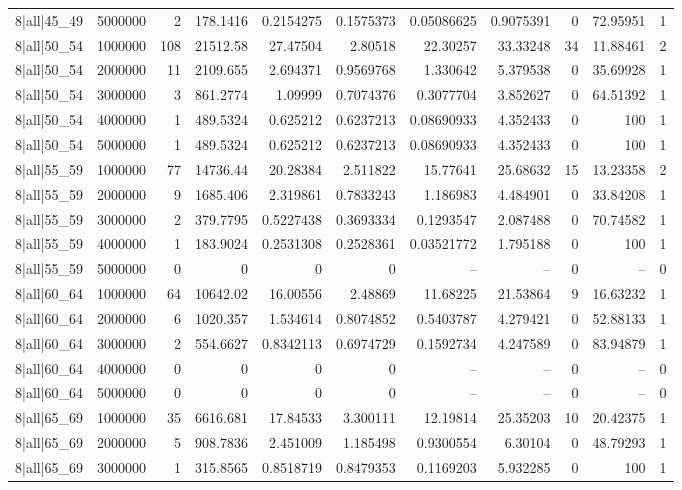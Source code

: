 \begin{tabular}{lrrrrrrrrrr}
8|all|45\_49 & 5000000 & 2 & 178.1416 & 0.2154275 & 0.1575373 & 0.05086625 & 0.9075391 & 0 & 72.95951 & 1 \\
8|all|50\_54 & 1000000 & 108 & 21512.58 & 27.47504 & 2.80518 & 22.30257 & 33.33248 & 34 & 11.88461 & 2 \\
8|all|50\_54 & 2000000 & 11 & 2109.655 & 2.694371 & 0.9569768 & 1.330642 & 5.379538 & 0 & 35.69928 & 1 \\
8|all|50\_54 & 3000000 & 3 & 861.2774 & 1.09999 & 0.7074376 & 0.3077704 & 3.852627 & 0 & 64.51392 & 1 \\
8|all|50\_54 & 4000000 & 1 & 489.5324 & 0.625212 & 0.6237213 & 0.08690933 & 4.352433 & 0 & 100 & 1 \\
8|all|50\_54 & 5000000 & 1 & 489.5324 & 0.625212 & 0.6237213 & 0.08690933 & 4.352433 & 0 & 100 & 1 \\
8|all|55\_59 & 1000000 & 77 & 14736.44 & 20.28384 & 2.511822 & 15.77641 & 25.68632 & 15 & 13.23358 & 2 \\
8|all|55\_59 & 2000000 & 9 & 1685.406 & 2.319861 & 0.7833243 & 1.186983 & 4.484901 & 0 & 33.84208 & 1 \\
8|all|55\_59 & 3000000 & 2 & 379.7795 & 0.5227438 & 0.3693334 & 0.1293547 & 2.087488 & 0 & 70.74582 & 1 \\
8|all|55\_59 & 4000000 & 1 & 183.9024 & 0.2531308 & 0.2528361 & 0.03521772 & 1.795188 & 0 & 100 & 1 \\
8|all|55\_59 & 5000000 & 0 & 0 & 0 & 0 & -- & -- & 0 & -- & 0 \\
8|all|60\_64 & 1000000 & 64 & 10642.02 & 16.00556 & 2.48869 & 11.68225 & 21.53864 & 9 & 16.63232 & 1 \\
8|all|60\_64 & 2000000 & 6 & 1020.357 & 1.534614 & 0.8074852 & 0.5403787 & 4.279421 & 0 & 52.88133 & 1 \\
8|all|60\_64 & 3000000 & 2 & 554.6627 & 0.8342113 & 0.6974729 & 0.1592734 & 4.247589 & 0 & 83.94879 & 1 \\
8|all|60\_64 & 4000000 & 0 & 0 & 0 & 0 & -- & -- & 0 & -- & 0 \\
8|all|60\_64 & 5000000 & 0 & 0 & 0 & 0 & -- & -- & 0 & -- & 0 \\
8|all|65\_69 & 1000000 & 35 & 6616.681 & 17.84533 & 3.300111 & 12.19814 & 25.35203 & 10 & 20.42375 & 1 \\
8|all|65\_69 & 2000000 & 5 & 908.7836 & 2.451009 & 1.185498 & 0.9300554 & 6.30104 & 0 & 48.79293 & 1 \\
8|all|65\_69 & 3000000 & 1 & 315.8565 & 0.8518719 & 0.8479353 & 0.1169203 & 5.932285 & 0 & 100 & 1 \\

\end{tabular}
